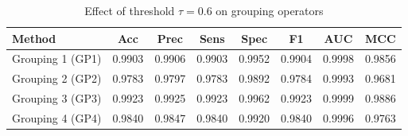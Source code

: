 \begin{table}[htbp]
\centering
\caption{Effect of threshold $\tau = 0.6$ on grouping operators}
\label{tab:t1_tau06}
\begin{tabular}{lccccccc}
\toprule
Method & Acc & Prec & Sens & Spec & F1 & AUC & MCC \\
\midrule
Grouping 1 (GP1) & 0.9903 & 0.9906 & 0.9903 & 0.9952 & 0.9904 & 0.9998 & 0.9856 \\
Grouping 2 (GP2) & 0.9783 & 0.9797 & 0.9783 & 0.9892 & 0.9784 & 0.9993 & 0.9681 \\
Grouping 3 (GP3) & 0.9923 & 0.9925 & 0.9923 & 0.9962 & 0.9923 & 0.9999 & 0.9886 \\
Grouping 4 (GP4) & 0.9840 & 0.9847 & 0.9840 & 0.9920 & 0.9840 & 0.9996 & 0.9763 \\
\bottomrule
\end{tabular}
\end{table}